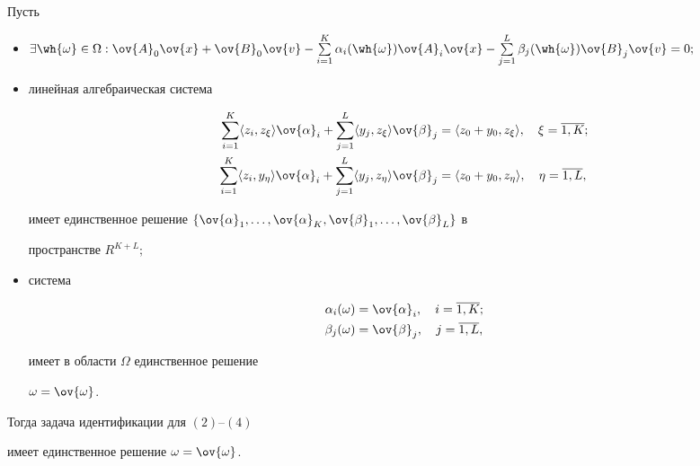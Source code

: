 \begin{thm}


Пусть


\begin{itemize}


\item[а)]


$\exists\wh{\omega}\in\Omega:\ov{A}_0\ov{x}+\ov{B}_0\ov{v}-


\sum\limits^K_{i=1}\alpha_i(\wh{\omega})


\ov{A}_i\ov{x} -


\sum\limits^L_{j=1}\beta_j(\wh{\omega})


\ov{B}_j\ov{v}=0;$


\item[б)] линейная алгебраическая система


\begin{equation}


\begin{split}


\sum\limits^K_{i=1}\langle z_i,z_\xi\rangle\ov{\alpha}_i+


\sum\limits^L_{j=1}\langle y_j,z_\xi\rangle\ov{\beta}_j &=


\langle z_0+y_0,z_\xi\rangle, \quad \xi=\overline{1,K};\\


%


\sum\limits^K_{i=1}\langle z_i,y_\eta\rangle\ov{\alpha}_i+


\sum\limits^L_{j=1}\langle y_j,z_\eta\rangle\ov{\beta}_j &=


\langle z_0+y_0,z_\eta\rangle, \quad \eta=\overline{1,L},


\end{split}


\end{equation}


имеет единственное решение $\{\ov{\alpha}_1,\dotsc,


\ov{\alpha}_K,\ov{\beta}_1, \dotsc,\ov{\beta}_L\}$ в


пространстве $R^{K+L};$


\item[в)] система


\begin{equation}


\begin{split}\alpha_i(\omega)&=\ov{\alpha}_i,\quad i=\overline{1,K};\\


\beta_j(\omega)&=\ov{\beta}_j,\quad j=\overline{1,L},


\end{split}


\end{equation}


имеет в области $\Omega$ единственное решение


$\omega=\ov{\omega}$.


\end{itemize}


Тогда задача идентификации для $(2)$--$(4)$ 


имеет единственное решение $\omega=\ov{\omega}$.


\end{thm}
